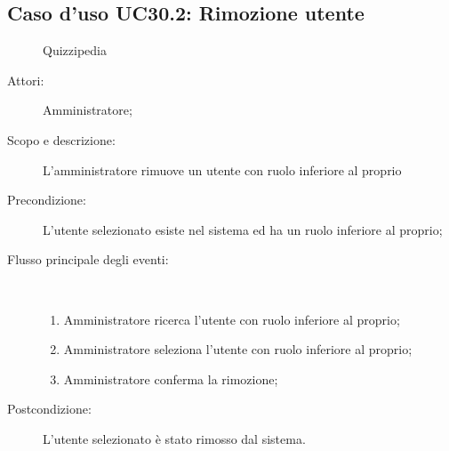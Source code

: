 \subsection{Caso d'uso UC30.2: Rimozione utente}
	\begin{figure}[H]
		\centering
		\begin{resizedtikzpicture}{\textwidth}
		\begin{umlsystem}[x=0, fill=lightgray!20]{Quizzipedia}
		\end{umlsystem}
		\end{resizedtikzpicture}
		\caption{}
	\end{figure}
\begin{description}
\item[Attori:] Amministratore;
\item[Scopo e descrizione:] L'amministratore rimuove un utente con ruolo inferiore al proprio
      \item[Precondizione:] L'utente selezionato esiste nel sistema ed ha un ruolo inferiore al proprio;

        \item[Flusso principale degli eventi:] \ 
 \begin{enumerate}
          \item Amministratore ricerca l'utente con ruolo inferiore al proprio;
          \item Amministratore seleziona l'utente con ruolo inferiore al proprio;
          \item Amministratore conferma la rimozione;

      \end{enumerate}
    \item[Postcondizione:] L'utente selezionato è stato rimosso dal sistema.
  \end{description}
\hypertarget{UC31}{}

